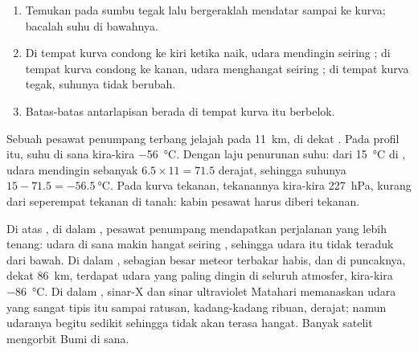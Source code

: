 \begin{method}\label{met:g8:the-atmosphere:profile}
\begin{enumerate}
  \item Temukan  pada sumbu tegak lalu bergeraklah mendatar
        sampai ke kurva; bacalah suhu di bawahnya.
  \item Di tempat kurva condong ke kiri ketika naik, udara mendingin
        seiring ; di tempat kurva condong ke kanan, udara menghangat
        seiring ; di tempat kurva tegak, suhunya tidak berubah.
  \item Batas-batas antarlapisan berada di tempat kurva itu berbelok.
\end{enumerate}
\end{method}

\begin{example}\label{ex:g8:the-atmosphere:airliner}
Sebuah pesawat penumpang terbang jelajah pada  \qty{11}{km}, di
dekat . Pada profil itu, suhu di sana kira-kira
\qty{-56}{\degreeCelsius}. Dengan laju penurunan suhu: dari
\qty{15}{\degreeCelsius} di , udara mendingin sebanyak
$6.5 \times 11 = 71.5$ derajat, sehingga suhunya $15 - 71.5 =
\qty{-56.5}{\degreeCelsius}$. Pada kurva tekanan, tekanannya kira-kira
\qty{227}{hPa}, kurang dari seperempat tekanan di tanah: kabin pesawat
harus diberi tekanan.
\end{example}

Di atas , di dalam , pesawat penumpang mendapatkan
perjalanan yang lebih tenang: udara di sana makin hangat seiring
, sehingga udara itu tidak teraduk dari bawah. Di dalam ,
sebagian besar meteor terbakar habis, dan di puncaknya, dekat
\qty{86}{km}, terdapat udara yang paling dingin di seluruh atmosfer,
kira-kira \qty{-86}{\degreeCelsius}. Di dalam , sinar-X dan sinar
ultraviolet Matahari memanaskan udara yang sangat tipis itu sampai ratusan,
kadang-kadang ribuan, derajat; namun udaranya begitu sedikit sehingga tidak
akan terasa hangat. Banyak satelit mengorbit Bumi di sana.

